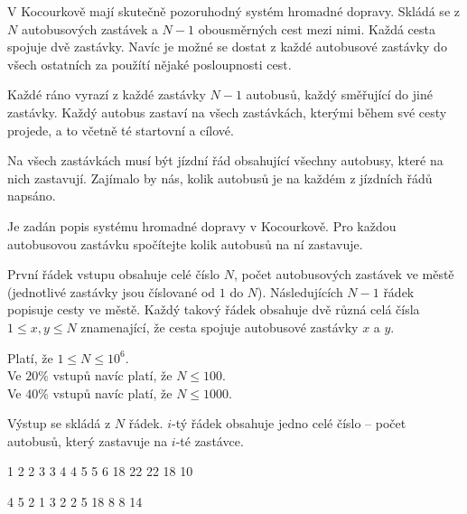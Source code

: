 





V Kocourkově mají skutečně pozoruhodný systém hromadné dopravy.
Skládá se z $N$ autobusových zastávek a $N-1$ obousměrných cest mezi nimi. Každá cesta spojuje dvě zastávky.
Navíc je možné se dostat z každé autobusové zastávky do všech ostatních za použítí nějaké posloupnosti cest.

Každé ráno vyrazí z každé zastávky $N-1$ autobusů, každý směřující do jiné zastávky.
Každý autobus zastaví na všech zastávkách, kterými během své cesty projede, a to včetně té startovní a cílové.

Na všech zastávkách musí být jízdní řád obsahující všechny autobusy, které na nich zastavují.
Zajímalo by nás, kolik autobusů je na každém z jízdních řádů napsáno.


Je zadán popis systému hromadné dopravy v Kocourkově.
Pro každou autobusovou zastávku spočítejte kolik autobusů na ní zastavuje.


První řádek vstupu obsahuje celé číslo $N$, počet autobusových zastávek ve městě (jednotlivé zastávky jsou číslované od $1$ do $N$).
Následujících $N-1$ řádek popisuje cesty ve městě.
Každý takový řádek obsahuje dvě různá celá čísla $1 \le x, y \le N$ znamenající, že cesta spojuje autobusové zastávky $x$ a $y$.

\bigskip
\noindent
Platí, že $1 \leq N \leq 10^6$.\\
Ve $20\%$ vstupů navíc platí, že $N \leq 100$.\\
Ve $40\%$ vstupů navíc platí, že $N \leq 1000$.


Výstup se skládá z $N$ řádek. $i$-tý řádek obsahuje jedno celé číslo -- počet autobusů, který zastavuje na $i$-té zastávce.


1 2
2 3
3 4
4 5
5 6
18
22
22
18
10
\sampleEND

\bigskip

4 5
2 1
3 2
2 5
18
8
8
14
\sampleEND


